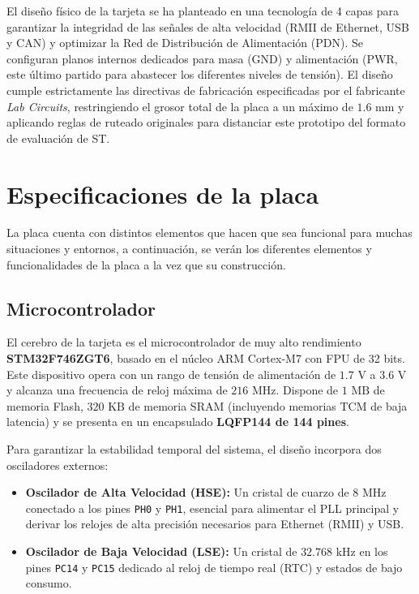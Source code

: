 \documentclass[12pt,a4paper]{article}
\begin{document}
El diseño físico de la tarjeta se ha planteado en una tecnología de 4 capas para garantizar la integridad de las señales de alta velocidad (RMII de Ethernet, USB y CAN) y optimizar la Red de Distribución de Alimentación (PDN). Se configuran planos internos dedicados para masa (GND) y alimentación (PWR, este último partido para abastecer los diferentes niveles de tensión). El diseño cumple estrictamente las directivas de fabricación especificadas por el fabricante \textit{Lab Circuits}, restringiendo el grosor total de la placa a un máximo de $1.6\text{ mm}$ y aplicando reglas de ruteado originales para distanciar este prototipo del formato de evaluación de ST.

\section{Especificaciones de la placa}
La placa cuenta con distintos elementos que hacen que sea funcional para muchas situaciones y entornos, a continuación, se verán los diferentes elementos y funcionalidades de la placa a la vez que su construcción.

\subsection{Microcontrolador}

El cerebro de la tarjeta es el microcontrolador de muy alto rendimiento \textbf{STM32F746ZGT6}, basado en el núcleo ARM Cortex-M7 con FPU de 32 bits. Este dispositivo opera con un rango de tensión de alimentación de $1.7\text{ V}$ a $3.6\text{ V}$ y alcanza una frecuencia de reloj máxima de $216\text{ MHz}$. Dispone de $1\text{ MB}$ de memoria Flash, $320\text{ KB}$ de memoria SRAM (incluyendo memorias TCM de baja latencia) y se presenta en un encapsulado \textbf{LQFP144 de 144 pines}.

Para garantizar la estabilidad temporal del sistema, el diseño incorpora dos osciladores externos:
\begin{itemize}
    \item \textbf{Oscilador de Alta Velocidad (HSE):} Un cristal de cuarzo de $8\text{ MHz}$ conectado a los pines \texttt{PH0} y \texttt{PH1}, esencial para alimentar el PLL principal y derivar los relojes de alta precisión necesarios para Ethernet (RMII) y USB.
    \item \textbf{Oscilador de Baja Velocidad (LSE):} Un cristal de $32.768\text{ kHz}$ en los pines \texttt{PC14} y \texttt{PC15} dedicado al reloj de tiempo real (RTC) y estados de bajo consumo.
\end{itemize}
\end{document}

